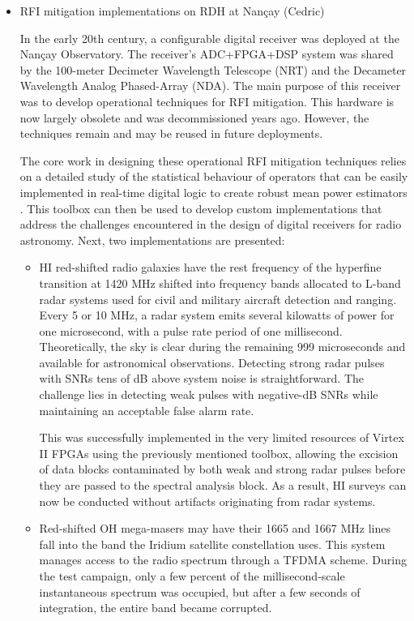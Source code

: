 \begin{itemize}
\item RFI mitigation implementations on RDH at Nançay (Cedric)

In the early 20th century, a configurable digital receiver was deployed at the Nançay Observatory. The receiver's ADC+FPGA+DSP system was shared by the 100-meter Decimeter Wavelength Telescope (NRT) and the Decameter Wavelength Analog Phased-Array (NDA). The main purpose of this receiver was to develop operational techniques for RFI mitigation. This hardware is now largely obsolete and was decommissioned years ago. However, the techniques remain and may be reused in future deployments.

The core work in designing these operational RFI mitigation techniques relies on a detailed study of the statistical behaviour of operators that can be easily implemented in real-time digital logic to create robust mean power estimators \cite{dumezviou:tel-00319939}. This toolbox can then be used to develop custom implementations that address the challenges encountered in the design of digital receivers for radio astronomy.  Next, two implementations are presented:

\begin{itemize}
\item HI red-shifted radio galaxies have the rest frequency of the hyperfine transition at 1420 MHz shifted into frequency bands allocated to L-band radar systems used for civil and military aircraft detection and ranging. Every 5 or 10 MHz, a radar system emits several kilowatts of power for one microsecond, with a pulse rate period of one millisecond. Theoretically, the sky is clear during the remaining 999 microseconds and available for astronomical observations. Detecting strong radar pulses with SNRs tens of dB above system noise is straightforward. The challenge lies in detecting weak pulses with negative-dB SNRs while maintaining an acceptable false alarm rate.

This was successfully implemented in the very limited resources of Virtex II FPGAs using the previously mentioned toolbox, allowing the excision of data blocks contaminated by both weak and strong radar pulses before they are passed to the spectral analysis block. As a result, HI surveys can now be conducted without artifacts originating from radar systems.


\item Red-shifted OH mega-masers may have their 1665 and 1667 MHz lines fall into the band the Iridium satellite constellation uses. This system manages access to the radio spectrum through a TFDMA scheme. During the test campaign, only a few percent of the millisecond-scale instantaneous spectrum was occupied, but after a few seconds of integration, the entire band became corrupted.


\end{itemize}
\end{itemize}
